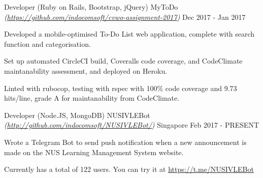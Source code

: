 

\begin{cventries}

	\cventry
		{Developer (Ruby on Rails, Bootstrap, jQuery)} %
		{MyToDo \textmd{\em\tiny(\url{https://github.com/indocomsoft/cvwo-assignment-2017})}} %
		{} %
		{Dec 2017 - Jan 2017} %
		{
			\begin{cvitems} %
				\item {Developed a mobile-optimised To-Do List web application, complete with search function and categorisation.}
				\item {Set up automated CircleCI build, Coveralls code coverage, and CodeClimate maintanability assessment, and deployed on Heroku.}
				\item {Linted with rubocop, testing with rspec with 100\% code coverage and 9.73 hits/line, grade A for maintanability from CodeClimate.}
			\end{cvitems}
		}
		
	
	\cventry
		{Developer (Node.JS, MongoDB)} %
		{NUSIVLEBot \textmd{\em\tiny(\url{http://github.com/indocomsoft/NUSIVLEBot/})}} %
		{Singapore} %
		{Feb 2017 - PRESENT} %
		{
			\begin{cvitems} %
				\item {Wrote a Telegram Bot to send push notification when a new announcement is made on the NUS Learning Management System website.}
				\item {Currently has a total of 122 users. You can try it at \url{https://t.me/NUSIVLEBot}}
			\end{cvitems}
		}
    

\end{cventries}
